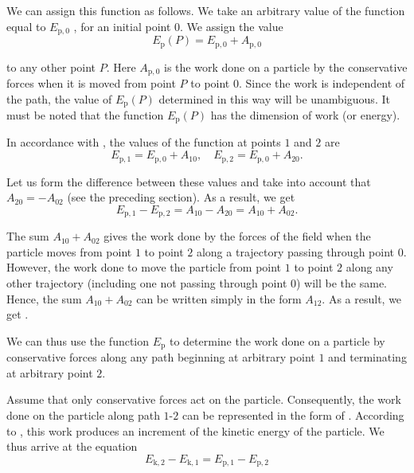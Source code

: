We can assign this function as follows. We take an arbitrary value of the function equal to $E_{\text{p},0}$ , for an initial point $0$. We assign the value
\begin{equation}\label{eq:3_27}
E_{\text{p}}(P) = E_{\text{p},0} + A_{\text{p},0}
\end{equation}

\noindent
to any other point $P$. Here $A_{\text{p},0}$ is the work done on a particle by the conservative forces when it is moved from point $P$ to point $0$. Since the work is independent of the path, the value of $E_{\text{p}}(P)$ determined in this way will be unambiguous. It must be noted that the function $E_{\text{p}}(P)$ has the dimension of work (or energy).

In accordance with , the values of the function at points $1$ and $2$ are
\begin{equation*}
E_{\text{p},1} = E_{\text{p},0} + A_{10},\quad E_{\text{p},2} = E_{\text{p},0} + A_{20}.
\end{equation*}

\noindent
Let us form the difference between these values and take into account that $A_{20}=-A_{02}$ (see the preceding section). As a result, we get
\begin{equation*}
E_{\text{p},1} - E_{\text{p},2} = A_{10} - A_{20} = A_{10} + A_{02}.
\end{equation*}

\noindent
The sum $A_{10}+A_{02}$ gives the work done by the forces of the field when the particle moves from point $1$ to point $2$ along a trajectory passing through point $0$. However, the work done to move the particle from point $1$ to point $2$ along any other trajectory (including one not passing through point $0$) will be the same. Hence, the sum $A_{10}+A_{02}$ can be written simply in the form $A_{12}$. As a result, we get .

We can thus use the function $E_{\text{p}}$ to determine the work done on a particle by conservative forces along any path beginning at arbitrary point $1$ and terminating at arbitrary point $2$.

Assume that only conservative forces act on the particle. Consequently, the work done on the particle along path $1$-$2$ can be represented in the form of . According to , this work produces an increment of the kinetic energy of the particle. We thus arrive at the equation
\begin{equation*}
E_{\text{k},2} - E_{\text{k},1} = E_{\text{p},1} - E_{\text{p},2}
\end{equation*}


